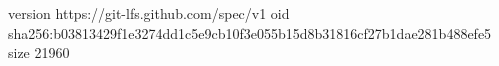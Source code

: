 version https://git-lfs.github.com/spec/v1
oid sha256:b03813429f1e3274dd1c5e9cb10f3e055b15d8b31816cf27b1dae281b488efe5
size 21960
